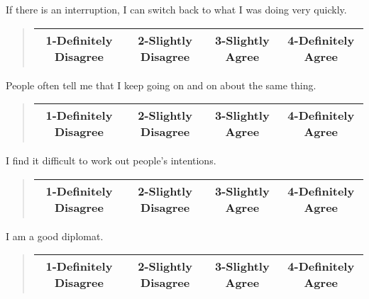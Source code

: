 \documentclass[11pt]{article}
\begin{document}
\begin{tcolorbox}
If there is an interruption, I can switch back to what I was doing very quickly. \\
\begin{quote}
\begin{center}
	\begin{tabular}{|c|c|c|c|}
\hline
		1-Definitely Disagree & 2-Slightly Disagree & 3-Slightly Agree & 4-Definitely Agree\\ \hline
	\end{tabular}
\end{center}
\end{quote}
\end{tcolorbox}
\begin{tcolorbox} 
People often tell me that I keep going on and on about the same thing. \\
\begin{quote}
\begin{center}
	\begin{tabular}{|c|c|c|c|}
\hline
		1-Definitely Disagree & 2-Slightly Disagree & 3-Slightly Agree & 4-Definitely Agree\\ \hline
	\end{tabular}
\end{center}
\end{quote}
\end{tcolorbox}
\begin{tcolorbox} 
I find it difficult to work out people's intentions.  \\
\begin{quote}
\begin{center}
	\begin{tabular}{|c|c|c|c|}
\hline
		1-Definitely Disagree & 2-Slightly Disagree & 3-Slightly Agree & 4-Definitely Agree\\ \hline
	\end{tabular}
\end{center}
\end{quote}
\end{tcolorbox}
\begin{tcolorbox}
I am a good diplomat. \\
\begin{quote}
\begin{center}
	\begin{tabular}{|c|c|c|c|}
\hline
		1-Definitely Disagree & 2-Slightly Disagree & 3-Slightly Agree & 4-Definitely Agree\\ \hline
	\end{tabular}
\end{center}
\end{quote} 
\end{tcolorbox}
\end{document}
